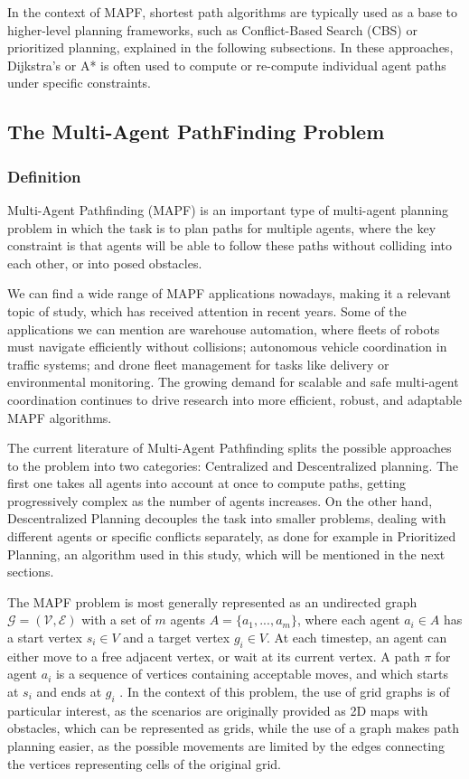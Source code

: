 In the context of MAPF, shortest path algorithms are typically used as a base to higher-level planning frameworks, such as Conflict-Based Search (CBS) or prioritized planning, explained in the following subsections. In these approaches, Dijkstra's or A* is often used to compute or re-compute individual agent paths under specific constraints. 

\subsection{The Multi-Agent PathFinding Problem}

\subsubsection{Definition}

Multi-Agent Pathfinding (MAPF) \cite{sternMultiAgentPathfindingDefinitions2019} is an important type of multi-agent planning problem in which the task is to plan paths for multiple agents, where the key constraint is that agents will be able to follow these paths without colliding into each other, or into posed obstacles.

We can find a wide range of MAPF applications nowadays, making it a relevant topic of study, which has received attention in recent years. Some of the applications we can mention are warehouse automation, where fleets of robots must navigate efficiently without collisions; autonomous vehicle coordination in traffic systems; and drone fleet management for tasks like delivery or environmental monitoring. The growing demand for scalable and safe multi-agent coordination continues to drive research into more efficient, robust, and adaptable MAPF algorithms.

The current literature of Multi-Agent Pathfinding splits the possible approaches to the problem into two categories: Centralized and Descentralized planning. The first one takes all agents into account at once to compute paths, getting progressively complex as the number of agents increases. On the other hand, Descentralized Planning decouples the task into smaller problems, dealing with different agents or specific conflicts separately, as done for example in Prioritized Planning, an algorithm used in this study, which will be mentioned in the next sections.

The MAPF problem is most generally represented as an undirected graph \( \mathcal{G} = (\mathcal{V}, \mathcal{E}) \) with a set of \(m\) agents \(A = \{a_1,...,a_m\}\), where each agent \(a_i \in A\) has a start vertex \(s_i \in V\) and a target vertex \(g_i \in V\). At each timestep, an agent can either move to a free adjacent vertex, or wait at its current vertex. A path \(\pi\) for agent \(a_i\) is a sequence of vertices containing acceptable moves, and which starts at \(s_i\) and ends at \(g_i\) \cite{liAnytimeMultiAgentPath2021}. In the context of this problem, the use of grid graphs is of particular interest, as the scenarios are originally provided as 2D maps with obstacles, which can be represented as grids, while the use of a graph makes path planning easier, as the possible movements are limited by the edges connecting the vertices representing cells of the original grid.

